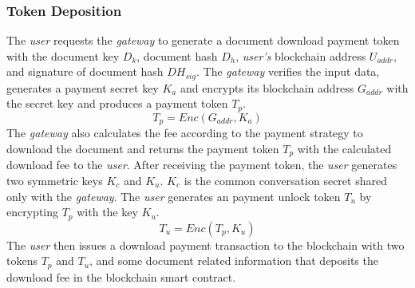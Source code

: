 \subsubsection{Token Deposition}
The {\it user} requests the {\it gateway} to generate a document download payment token with the document key $D_k$, document hash $D_{h}$, {\it user's} blockchain address $U_{addr}$, and signature of document hash $DH_{sig}$. The {\it gateway} verifies the input data, generates a payment secret key $K_a$ and encrypts its blockchain address $G_{addr}$ with the secret key and produces a payment token $T_{p}$. 
\begin{equation}
\label{eq-d-1}
T_p = Enc (G_{addr}, K_a)
\end{equation}
The {\it gateway} also calculates the fee according to the payment strategy to download the document and returns the payment token $T_p$ with the calculated download fee to the {\it user}.
After receiving the payment token, the {\it user} generates two symmetric keys $K_c$ and $K_u$. $K_c$ is the common conversation secret shared only with the {\it gateway}. The {\it user} generates an payment unlock token $T_u$ by encrypting $T_p$ with the key $K_u$.
\begin{equation}
\label{eq-d-2}
T_u = Enc (T_p, K_u)
\end{equation}
The {\it user} then issues a download payment transaction to the blockchain with two tokens $T_p$ and $T_u$, and some document related information that deposits the download fee in the blockchain smart contract.

